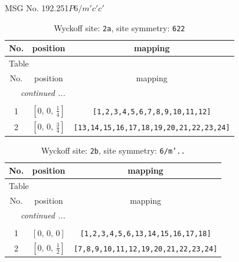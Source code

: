 \documentclass[fleqn,8pt]{jsarticle}
\begin{document}
\setcounter{MaxMatrixCols}{32}

\renewcommand{\tablename}{Table~}
\renewcommand{\figurename}{Figure~}
\begin{center}
\LARGE
MSG No. 192.251\quad$P6/m'c'c'$
\end{center}
\renewcommand{\arraystretch}{1.2}
\begin{longtable}{ccc}
\caption{Wyckoff site: {\tt 2a}, site symmetry: {\tt 622}}
 \\
 \hline \hline
No. & position & mapping \\ \hline \endfirsthead

\multicolumn{2}{l}{\tablename\ \thetable{}} \\
 \hline \hline
No. & position & mapping \\ \hline \endhead

 \hline \hline
\multicolumn{2}{r}{\footnotesize\it continued ...} \\ \endfoot

 \hline \hline
\multicolumn{2}{r}{} \\ \endlastfoot

1 & $\left[ 0,\, 0,\, \frac{1}{4} \right]$ & {\tt [1,2,3,4,5,6,7,8,9,10,11,12]} \\ \hline
2 & $\left[ 0,\, 0,\, \frac{3}{4} \right]$ & {\tt [13,14,15,16,17,18,19,20,21,22,23,24]} \\
\end{longtable}
\renewcommand{\arraystretch}{1.2}
\begin{longtable}{ccc}
\caption{Wyckoff site: {\tt 2b}, site symmetry: {\tt 6/m'..}}
 \\
 \hline \hline
No. & position & mapping \\ \hline \endfirsthead

\multicolumn{2}{l}{\tablename\ \thetable{}} \\
 \hline \hline
No. & position & mapping \\ \hline \endhead

 \hline \hline
\multicolumn{2}{r}{\footnotesize\it continued ...} \\ \endfoot

 \hline \hline
\multicolumn{2}{r}{} \\ \endlastfoot

1 & $\left[ 0,\, 0,\, 0 \right]$ & {\tt [1,2,3,4,5,6,13,14,15,16,17,18]} \\ \hline
2 & $\left[ 0,\, 0,\, \frac{1}{2} \right]$ & {\tt [7,8,9,10,11,12,19,20,21,22,23,24]} \\
\end{longtable}
\end{document}
